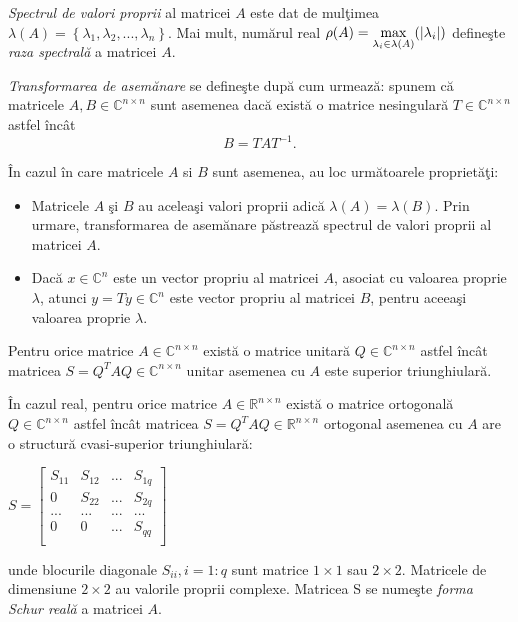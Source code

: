 \documentclass{exam}
\begin{document}
\textit{Spectrul de valori proprii} al matricei $A$ este dat de mulţimea $\lambda(A) = \left\lbrace \lambda_{1}, \lambda_{2}, ..., \lambda_{n}\right\rbrace $. Mai mult, numărul real $\rho(A) = \smash{\displaystyle\max_{\lambda_{i} \in \lambda(A)}}(|\lambda_{i}|)$ defineşte  \textit{raza spectrală} a matricei $A$.

\textit{Transformarea de asemănare} se defineşte după cum urmează: spunem că matricele $A, B \in \mathbb{C}^{n \times n}$ sunt asemenea dacă există o matrice nesingulară $T \in \mathbb{C}^{n \times n}$ astfel încât
$$B = TAT^{-1}.$$

În cazul în care matricele $A$ si $B$ sunt asemenea, au loc următoarele proprietăţi:
\begin{itemize}
	\item Matricele $A$ şi $B$ au aceleaşi valori proprii adică $\lambda(A)=\lambda(B)$. Prin urmare, transformarea de asemănare păstrează spectrul de valori proprii al matricei $A$.
	\item Dacă $x \in \mathbb{C}^{n}$ este un vector propriu al matricei $A$, asociat cu valoarea proprie $\lambda$, atunci $y=Ty \in \mathbb{C}^{n}$ este vector propriu al matricei $B$, pentru aceeaşi valoarea proprie $\lambda$.
\end{itemize}

Pentru orice matrice $A \in \mathbb{C}^{n \times n}$ există o matrice unitară $\overset{~}{Q} \in \mathbb{C}^{n \times n}$ astfel încât matricea $S = Q^{T}AQ \in \mathbb{C}^{n \times n}$ unitar asemenea cu $A$ este superior triunghiulară.

În cazul real, pentru orice matrice $A \in \mathbb{R}^{n \times n}$ există o matrice ortogonală $Q \in \mathbb{C}^{n \times n}$ astfel încât matricea $S = Q^{T}AQ \in \mathbb{R}^{n \times n}$ ortogonal asemenea
cu $A$ are o structură cvasi-superior triunghiulară:

\begin{center}
	$S = \begin{bmatrix} S_{11} & S_{12} & ... & S_{1q} \\
                0      & S_{22} & ... & S_{2q} \\
                ...    & ...    & ... & ...    \\
                0      & 0      & ... & S_{qq} \\
		\end{bmatrix}$
\end{center}

\noindent  unde blocurile diagonale $S_{ii}, i = 1:q$ sunt matrice $1 \times 1$ sau $2 \times 2$. Matricele de dimensiune $2 \times 2$ au valorile proprii complexe. Matricea S se numeşte \textit{forma Schur reală} a matricei $A$.
\end{document}
